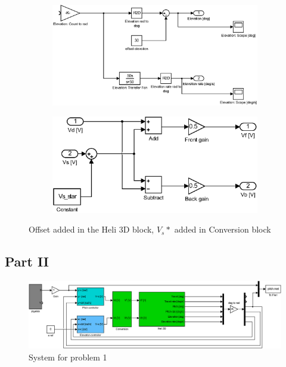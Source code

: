 \begin{figure}[H]
\begin{subfigure}{0.5\textwidth}
    \includegraphics[width=0.9\linewidth]{Part1_Pictures/p1p4offset.eps} 
\end{subfigure}
\begin{subfigure}{0.5\textwidth}
    \includegraphics[width=0.9\linewidth]{Part2_pictures/p2p1_Vs_added.eps}
\end{subfigure}
\caption{Offset added in the Heli 3D block, $V_s*$ added in Conversion block}
\label{fig:vs_add}
\end{figure}


\subsection{Part II}
\begin{figure}[H]
    \begin{center}
    \includegraphics[width=1\linewidth]{Part2_pictures/p2p1sys.eps}
    \caption{System for problem 1}
    \end{center}
\end{figure}

